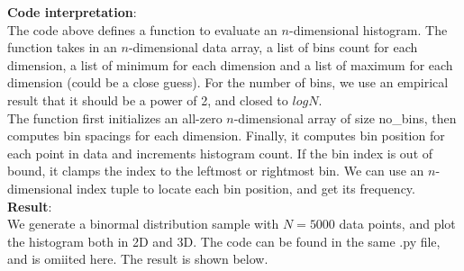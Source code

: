 \documentclass[UTF8]{ctexart}
\begin{document}
\textbf{Code interpretation}:\\
The code above defines a function to evaluate an $n$-dimensional histogram. 
The function takes in an $n$-dimensional data array, a list of bins count for each dimension, a list of minimum for each dimension and a list of maximum for each dimension (could be a close guess). 
For the number of bins, we use an empirical result that it should be a power of 2, and closed to $logN$.\\
The function first initializes an all-zero $n$-dimensional array of size no\_bins, then computes bin spacings for each dimension. Finally, it computes bin position for each point in data and increments histogram count.
If the bin index is out of bound, it clamps the index to the leftmost or rightmost bin. We can use an $n$-dimensional index tuple to locate each bin position, and get its frequency.\\
\textbf{Result}:\\
We generate a binormal distribution sample with $N=5000$ data points, and plot the histogram both in 2D and 3D. The code can be found in the same .py file, and is omiited here.
The result is shown below.\\
\end{document}
